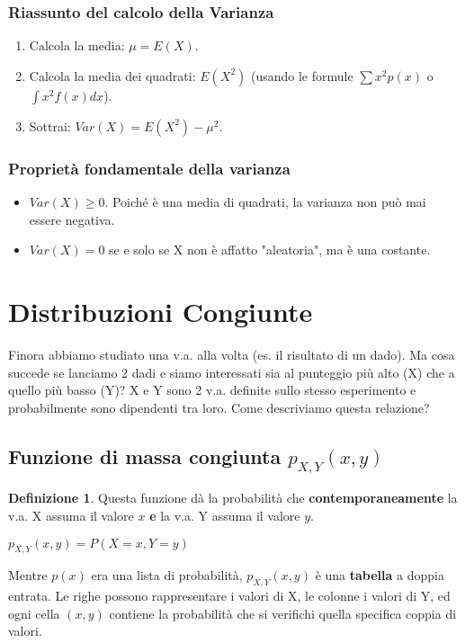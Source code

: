 \documentclass[a4paper, 11pt]{article}
\theoremstyle{definition}
\newtheorem{definizione}{Definizione}[section]
\begin{document}
\subsubsection*{Riassunto del calcolo della Varianza}
\begin{enumerate}
    \item Calcola la media: $\mu = E(X)$.
    \item Calcola la media dei quadrati: $E(X^2)$ (usando le formule $\sum x^2 p(x)$ o $\int x^2 f(x)dx$).
    \item Sottrai: $Var(X) = E(X^2) - \mu^2$.
\end{enumerate}

\subsubsection*{Proprietà fondamentale della varianza}
\begin{itemize}
    \item $Var(X) \ge 0$. Poiché è una media di quadrati, la varianza non può mai essere negativa.
    \item $Var(X)=0$ se e solo se X non è affatto "aleatoria", ma è una costante.
\end{itemize}

\newpage

\section{Distribuzioni Congiunte}
Finora abbiamo studiato una v.a. alla volta (es. il risultato di un dado). Ma cosa succede se lanciamo 2 dadi e siamo interessati sia al punteggio più alto (X) che a quello più basso (Y)? X e Y sono 2 v.a. definite sullo stesso esperimento e probabilmente sono dipendenti tra loro. Come descriviamo questa relazione?

\subsection{Funzione di massa congiunta $p_{X,Y}(x,y)$}
\begin{definizione}
Questa funzione dà la probabilità che \textbf{contemporaneamente} la v.a. X assuma il valore $x$ \textbf{e} la v.a. Y assuma il valore $y$.
\begin{formulabox}
    $p_{X,Y}(x,y) = P(X=x, Y=y)$
\end{formulabox}
Mentre $p(x)$ era una lista di probabilità, $p_{X,Y}(x,y)$ è una \textbf{tabella} a doppia entrata. Le righe possono rappresentare i valori di X, le colonne i valori di Y, ed ogni cella $(x,y)$ contiene la probabilità che si verifichi quella specifica coppia di valori.
\end{definizione}
\end{document}
